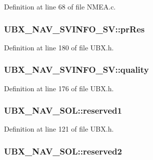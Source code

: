 Definition at line 68 of file N\-M\-E\-A.\-c.

\hypertarget{group___g_s_p_module_gadf2342e560319acf1b48051a49463b09}{
\subsubsection[{pr\-Res}]{ U\-B\-X\-\_\-\-N\-A\-V\-\_\-\-S\-V\-I\-N\-F\-O\-\_\-\-S\-V\-::pr\-Res}}\label{group___g_s_p_module_gadf2342e560319acf1b48051a49463b09}


Definition at line 180 of file U\-B\-X.\-h.

\hypertarget{group___g_s_p_module_ga3d99d4c098bc0ba52408def4080330c5}{
\subsubsection[{quality}]{ U\-B\-X\-\_\-\-N\-A\-V\-\_\-\-S\-V\-I\-N\-F\-O\-\_\-\-S\-V\-::quality}}\label{group___g_s_p_module_ga3d99d4c098bc0ba52408def4080330c5}


Definition at line 176 of file U\-B\-X.\-h.

\hypertarget{group___g_s_p_module_gaa1df4884b23e42bf16bc237341d5001c}{
\subsubsection[{reserved1}]{ U\-B\-X\-\_\-\-N\-A\-V\-\_\-\-S\-O\-L\-::reserved1}}\label{group___g_s_p_module_gaa1df4884b23e42bf16bc237341d5001c}


Definition at line 121 of file U\-B\-X.\-h.

\hypertarget{group___g_s_p_module_ga2367f145076ebc428ec4ef901cdda367}{
\subsubsection[{reserved2}]{ U\-B\-X\-\_\-\-N\-A\-V\-\_\-\-S\-O\-L\-::reserved2}}\label{group___g_s_p_module_ga2367f145076ebc428ec4ef901cdda367}


